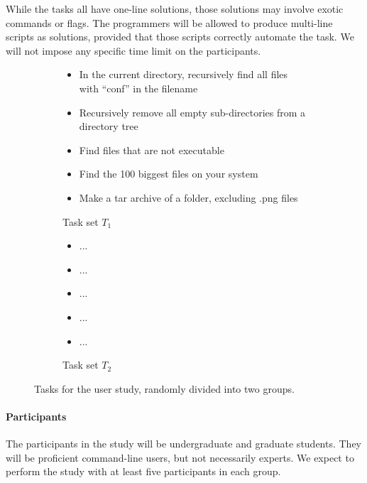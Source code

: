 While the tasks all have one-line solutions, those solutions may involve exotic
commands or flags. The programmers will be allowed to produce multi-line scripts
as solutions, provided that those scripts correctly automate the task. We will
not impose any specific time limit on the participants.

\begin{figure}[ht]
    \begin{subfigure}[b]{0.48\textwidth}
        \begin{framed}
        \begin{itemize}\itemsep-1pt
            \item In the current directory, recursively find all files with ``conf''
                in the filename
            \item Recursively remove all empty sub-directories from a directory tree
            \item Find files that are not executable
            \item Find the 100 biggest files on your system
            \item Make a tar archive of a folder, excluding .png files
        \end{itemize}
        \end{framed}
        \caption{Task set $T_1$}
    \end{subfigure}
    \begin{subfigure}[b]{0.48\textwidth}
        \begin{framed}
        \begin{itemize}\itemsep-1pt
            \item ...
            \item ...
            \item ...
            \item ...
            \item ...
        \end{itemize}
        \end{framed}
        \caption{Task set $T_2$}
    \end{subfigure}
    \caption{Tasks for the user study, randomly divided into two groups.}
    \vspace{-10pt}
    \label{fig:tasks}
\end{figure}

\paragraph{Participants} The participants in the study will be undergraduate and
graduate students. They will be proficient command-line users, but not
necessarily experts. We expect to perform the study with at least five
participants in each group.

